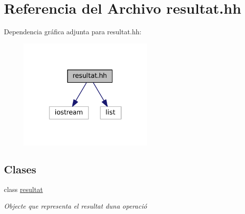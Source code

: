 \hypertarget{resultat_8hh}{}\section{Referencia del Archivo resultat.\+hh}
\label{resultat_8hh}
Dependencia gráfica adjunta para resultat.\+hh\+:\nopagebreak
\begin{figure}[H]
\begin{center}
\leavevmode
\includegraphics[width=190pt]{resultat_8hh__incl}
\end{center}
\end{figure}
\subsection*{Clases}
\begin{DoxyCompactItemize}
\item 
class \hyperlink{classresultat}{resultat}
\begin{DoxyCompactList}\small\item\em Objecte que representa el resultat d\textquotesingle{}una operació \end{DoxyCompactList}\end{DoxyCompactItemize}
